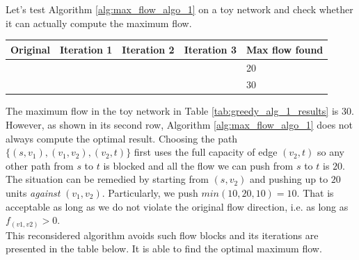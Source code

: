 \documentclass[a4paper]{article}
\begin{document}
Let's test Algorithm \ref{alg:max_flow_algo_1} on a toy network and check whether it can actually compute the maximum flow. \\
\begin{minipage}{\linewidth}
\label{tab:greedy_alg_1_results}
 \label{tab:SVD_image_results} 
\begin{center}
\begin{tabular}{| m{} | m{} | m{}  | m{} | m{} |}
\hline   
    \textbf{Original} & \textbf{Iteration 1} & \textbf{Iteration 2} & \textbf{Iteration 3} & \textbf{Max flow found}\\
\hline 
\hline 
     &  &  &  & 20\\
\hline 
     &  &  &  & 30\\
\hline

\end{tabular}
\end{center}
\end{minipage}

The maximum flow in the toy network in Table \ref{tab:greedy_alg_1_results} is $30$. However, as shown in its second row, Algorithm \ref{alg:max_flow_algo_1} does not always compute the optimal result. Choosing the path $\{(s,v_1), (v_1,v_2), (v_2,t)\}$ first uses the full capacity of edge $(v_2,t)$ so any other path from $s$ to $t$ is blocked and all the flow we can push from $s$ to $t$ is $20$. The situation can be remedied by starting from $(s,v_2)$ and pushing up to $20$ units \textit{\color{red} against} $(v_1,v_2)$. Particularly, we push $min(10,20,10)=10$. That is acceptable as long as we do not violate the original flow direction, i.e. as long as $f_{(v1,v2)}>0$.\\
This reconsidered algorithm avoids such flow blocks and its iterations are presented in the table below. It is able to find the optimal maximum flow.
\end{document}
